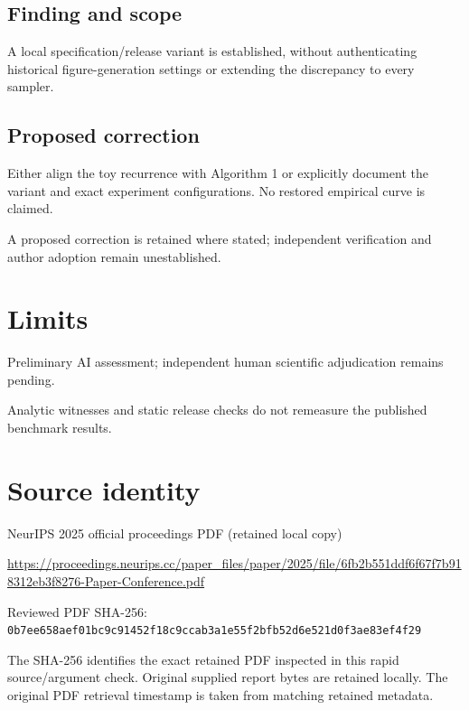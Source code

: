 \documentclass[11pt]{article}
\begin{document}
\subsection*{Finding and scope}

A local specification/release variant is established, without authenticating historical figure-generation settings or extending the discrepancy to every sampler.

\subsection*{Proposed correction}

Either align the toy recurrence with Algorithm 1 or explicitly document the variant and exact experiment configurations. No restored empirical curve is claimed.

A proposed correction is retained where stated; independent verification and author adoption remain unestablished.

\section*{Limits}

Preliminary AI assessment; independent human scientific adjudication remains pending.\par

Analytic witnesses and static release checks do not remeasure the published benchmark results.\par

\section*{Source identity}

NeurIPS 2025 official proceedings PDF (retained local copy)

\url{https://proceedings.neurips.cc/paper_files/paper/2025/file/6fb2b551ddf6f67f7b918312eb3f8276-Paper-Conference.pdf}

Reviewed PDF SHA-256: \nolinkurl{0b7ee658aef01bc9c91452f18c9ccab3a1e55f2bfb52d6e521d0f3ae83ef4f29}

The SHA-256 identifies the exact retained PDF inspected in this rapid source/argument check. Original supplied report bytes are retained locally. The original PDF retrieval timestamp is taken from matching retained metadata.
\end{document}
